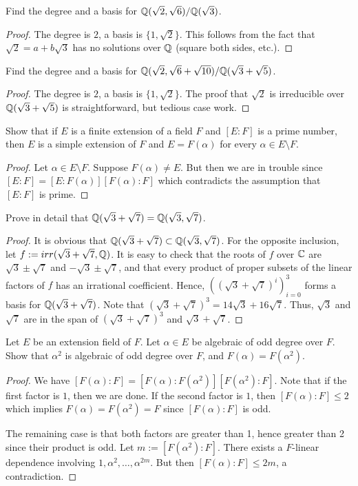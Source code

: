 \documentclass{article}
\begin{document}
 Find the degree and a basis for $\mathbb{Q}(\sqrt{2}, \sqrt{6}) / \mathbb{Q}(\sqrt{3})$.
\begin{proof}
The degree is $2$, a basis is $\{1, \sqrt 2\}$.  This follows from the fact that $\sqrt 2 = a + b\sqrt 3$ has no solutions over $\mathbb{Q}$ (square both sides, etc.).
\end{proof}
 Find the degree and a basis for $\mathbb{Q}(\sqrt{2}, \sqrt{6} + \sqrt{10}) / \mathbb{Q}(\sqrt{3} + \sqrt{5})$.
\begin{proof}
The degree is $2$, a basis is $\{1, \sqrt 2\}$. The proof that $\sqrt 2$ is irreducible over $\mathbb{Q}(\sqrt{3} + \sqrt{5})$ is straightforward, but tedious case work.
\end{proof}
 Show that if $E$ is a finite extension of a field $F$ and $[E : F]$ is a prime number, then $E$ is a simple extension of $F$ and $E = F(\alpha)$ for every $\alpha \in E\setminus F$.
\begin{proof}
Let $\alpha \in E\setminus F$. Suppose $F(\alpha) \neq E$.  But then we are in trouble since $[E : F] = [E : F(\alpha)] [F(\alpha) : F]$ which contradicts the assumption that $[E:F]$ is prime.

\end{proof}
 Prove in detail that $\mathbb{Q}(\sqrt{3} + \sqrt{7}) = \mathbb{Q}(\sqrt{3}, \sqrt{7})$.
\begin{proof}
It is obvious that $\mathbb{Q}(\sqrt{3} + \sqrt{7}) \subset \mathbb{Q}(\sqrt{3}, \sqrt{7})$.
For the opposite inclusion, let $f := irr(\sqrt 3 + \sqrt 7 , \mathbb{Q})$.  It is easy to check that the roots of $f$ over $\mathbb{C}$ are $\sqrt 3 \pm \sqrt 7$ and $-\sqrt 3 \pm \sqrt 7$, and that every product of proper subsets of the linear factors of $f$ has an irrational coefficient. Hence, $((\sqrt 3 + \sqrt 7)^i)_{i=0}^3$ forms a basis for $\mathbb{Q}(\sqrt 3 + \sqrt 7)$. Note that $(\sqrt 3 + \sqrt 7)^3 = 14 \sqrt 3 + 16 \sqrt 7$. Thus, $\sqrt 3$ and $\sqrt 7$ are in the span of $(\sqrt 3 + \sqrt 7)^3$ and $\sqrt 3 + \sqrt 7$.
\end{proof}
 Let $E$ be an extension field of $F$. Let $\alpha \in E$ be algebraic of odd degree over $F$. Show that $\alpha^2$ is algebraic of odd degree over $F$, and $F(\alpha) = F(\alpha^2)$.
\begin{proof}
We have $[F(\alpha) : F] = [F(\alpha):F(\alpha^2)] [F(\alpha^2): F]$. Note that if the first factor is $1$, then we are done.  If the second factor is $1$,  then $[F(\alpha) : F] \leq 2$ which implies $F(\alpha) = F(\alpha^2) = F$ since $[F(\alpha) : F]$ is odd.

The remaining case is that both factors are greater than 1, hence greater than 2 since their product is odd. Let $m:= [F(\alpha^2): F]$. There exists a $F$-linear dependence involving ${1, \alpha^2, \ldots, \alpha^{2m}}$. But then $[F(\alpha) : F] \leq 2m$, a contradiction.

\end{proof}
\end{document}

